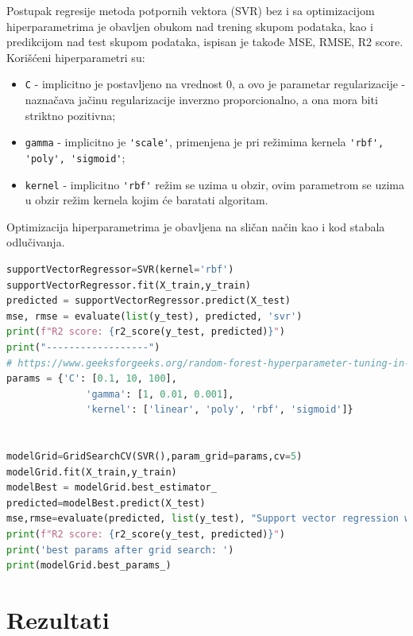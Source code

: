 \documentclass[fontsize=12bp, paper=a4]{scrarticle}
\renewcommand\lstlistingname{Implementacija}
\renewcommand\lstlistlistingname{Implementacija}
\begin{document}
Postupak regresije metoda potpornih vektora (SVR)\cite{SVR} bez i sa optimizacijom hiperparametrima je obavljen obukom nad trening skupom podataka, kao i predikcijom nad test skupom podataka, ispisan je takođe MSE, RMSE, R2 score. Korišćeni hiperparametri su: 
\begin{itemize}
    \item \verb|C| - implicitno je postavljeno na vrednost 0, a ovo je parametar regularizacije - naznačava jačinu regularizacije inverzno proporcionalno, a ona mora biti striktno pozitivna;
    \item \verb|gamma| - implicitno je \verb|'scale'|, primenjena je pri režimima kernela \verb|'rbf', 'poly', 'sigmoid'|;
    \item \verb|kernel| - implicitno \verb|'rbf'| režim se uzima u obzir, ovim parametrom se uzima u obzir režim kernela kojim će baratati algoritam.
\end{itemize}
Optimizacija hiperparametrima je obavljena na sličan način kao i kod stabala odlučivanja.
\begin{lstlisting}[language=Python, caption=\centering Postupak regresije metoda potpornih vektora (SVR) bez i sa optimizacijom hiperparametrima]
supportVectorRegressor=SVR(kernel='rbf')
supportVectorRegressor.fit(X_train,y_train)
predicted = supportVectorRegressor.predict(X_test)
mse, rmse = evaluate(list(y_test), predicted, 'svr')
print(f"R2 score: {r2_score(y_test, predicted)}")
print("------------------")
# https://www.geeksforgeeks.org/random-forest-hyperparameter-tuning-in-python/
params = {'C': [0.1, 10, 100],  
              'gamma': [1, 0.01, 0.001], 
              'kernel': ['linear', 'poly', 'rbf', 'sigmoid']}  


modelGrid=GridSearchCV(SVR(),param_grid=params,cv=5)
modelGrid.fit(X_train,y_train)
modelBest = modelGrid.best_estimator_
predicted=modelBest.predict(X_test)
mse,rmse=evaluate(predicted, list(y_test), "Support vector regression with hyperparameter optimization")
print(f"R2 score: {r2_score(y_test, predicted)}")
print('best params after grid search: ')
print(modelGrid.best_params_)
\end{lstlisting}

\newpage
\renewcommand\lstlistingname{Izlaz}
\renewcommand\lstlistlistingname{Izlaz}
\setcounter{lstlisting}{1}

\section{Rezultati}
\end{document}
